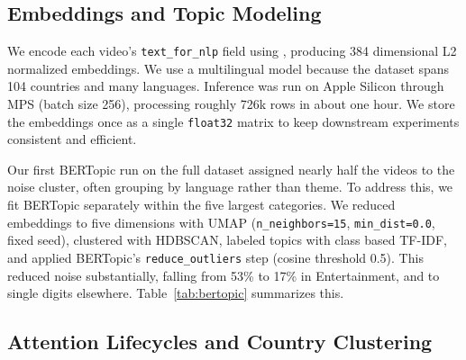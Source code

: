 \documentclass[sigconf,11pt]{acmart}
\begin{document}
\subsection{Embeddings and Topic Modeling}

We encode each video's \texttt{text\_for\_nlp} field using 
\texttt{}, 
producing 384 dimensional L2 normalized embeddings. We use a multilingual model because the dataset spans 104 countries and many languages. Inference was run on Apple Silicon through MPS (batch size 256), processing roughly 726k rows in about one hour. We store the embeddings once as a single \texttt{float32} matrix to keep downstream experiments consistent and efficient.

Our first BERTopic run on the full dataset assigned nearly half the videos to the noise cluster, often grouping by language rather than theme. To address this, we fit BERTopic separately within the five largest categories. We reduced embeddings to five dimensions with UMAP (\texttt{n\_neighbors=15}, \texttt{min\_dist=0.0}, fixed seed), clustered with HDBSCAN, labeled topics with class based TF-IDF, and applied BERTopic’s \texttt{reduce\_outliers} step (cosine threshold 0.5). This reduced noise substantially, falling from 53\% to 17\% in Entertainment, and to single digits elsewhere. Table~\ref{tab:bertopic} summarizes this.

\begin{table}[ht]
\centering
\small
\caption{BERTopic results per category before and after embedding-based outlier reduction.}
\label{tab:bertopic}
\end{table}

\subsection{Attention Lifecycles and Country Clustering}
\end{document}
